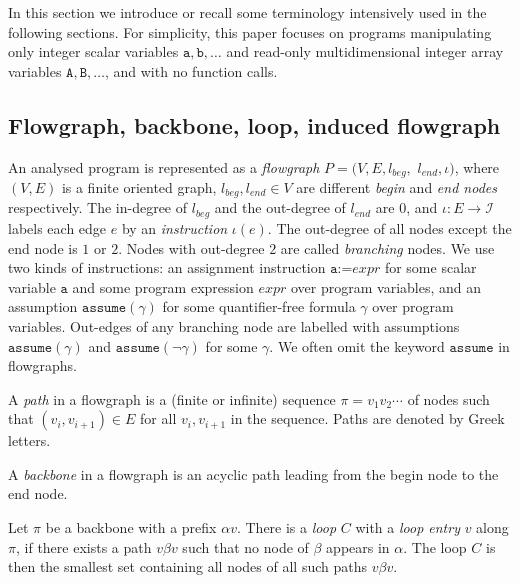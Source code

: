 \documentclass[10pt,a4paper]{article}
\newcommand{\var}[1]{\texttt{#1}}
\newcommand{\expr}{\mathit{expr}}
\begin{document}
In this section we introduce or recall some terminology intensively used in
the following sections. For simplicity, this paper focuses on programs
manipulating only integer scalar variables $\var{a},\var{b},\ldots$ and
read-only multidimensional integer array variables $\var{A},\var{B},\ldots$,
and with no function calls.

\subsection{Flowgraph, backbone, loop, induced flowgraph}
\label{sec:flowgraph}

An analysed program is represented as a \emph{flowgraph}
$P=(V,E,l_\mathit{beg},$ $l_\mathit{end},\iota)$, where $(V,E)$ is a finite
oriented graph, $l_\mathit{beg},l_\mathit{end}\in V$ are different
\emph{begin} and \emph{end nodes} respectively. The in-degree of
$l_\mathit{beg}$ and the out-degree of $l_\mathit{end}$ are 0, and
$\iota:E\rightarrow\mathcal{I}$ labels each edge $e$ by an
\emph{instruction} $\iota(e)$. The out-degree of all nodes except the end
node is $1$ or $2$. Nodes with out-degree $2$ are called \emph{branching}
nodes. We use two kinds of instructions: an assignment instruction
$\var{a}\texttt{:=}\expr$ for some scalar variable $\var{a}$ and some
program expression $\expr$ over program variables, and an assumption
$\texttt{assume}(\gamma)$ for some quantifier-free formula $\gamma$ over
program variables. Out-edges of any branching node are labelled with
assumptions $\texttt{assume}(\gamma)$ and $\texttt{assume}(\neg\gamma)$ for
some $\gamma$. We often omit the keyword $\texttt{assume}$ in flowgraphs.

A \emph{path} in a flowgraph is a (finite or infinite) sequence $\pi=v_1 v_2
\cdots$ of nodes such that $(v_i, v_{i+1})\in E$ for all $v_i,v_{i+1}$ in the
sequence. Paths are denoted by Greek letters.

A \emph{backbone} in a flowgraph is an acyclic path leading from the begin node
to the end node.

Let $\pi$ be a backbone with a prefix $\alpha v$. There is a \emph{loop} $C$
with a \emph{loop entry} $v$ along $\pi$, if there exists a path $v\beta v$ such
that no node of $\beta$ appears in $\alpha$. The loop $C$ is then the smallest
set containing all nodes of all such paths $v\beta v$.
\end{document}
